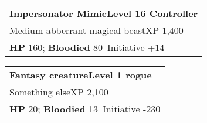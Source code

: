 \documentclass{article}
\newcommand{\printstattable}{%
		\begin{tabular}{p{\linewidth}}
			\rowcolor{darkgreen}\color{white}\bfseries \name \hfill \level \\
			\rowcolor{darkgreen}\color{white} \creaturedescription    \hfill XP \experience\\
			\rowcolor{lightgray}\textbf{HP} \hp; \textbf{Bloodied} \bloodied\, Initiative \initiative\\
		\end{tabular}
	}
\newcommand{\setbasicstats}[4]{%
		\def\name{#1}%
		\def\creaturedescription{#2}%
		\def\level{#3}%
		\def\experience{#4}%
	}
\begin{document}
\setbasicstats{Impersonator Mimic}{Medium abberrant magical beast}{Level 16 Controller}{1,400} 
\def\hp{160}
\def\bloodied{80}
\def\initiative{+14}
\printstattable

\vspace{2cm}
\setbasicstats{Fantasy creature}{Something else}{Level 1 rogue}{2,100} 
\def\hp{20}
\def\bloodied{13}
\def\initiative{-230}
\printstattable
\end{document}
